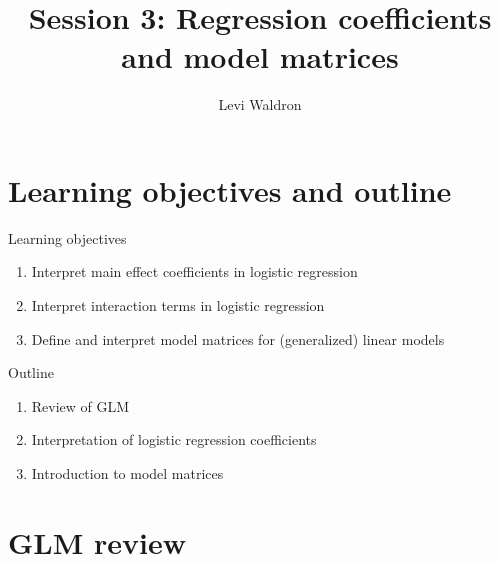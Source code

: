\documentclass[
  ignorenonframetext,
]{beamer}
\title{Session 3: Regression coefficients and model matrices}
\author{Levi Waldron}
\date{}
\institute{CUNY SPH Biostatistics 2}
\providecommand{\tightlist}{%
  \setlength{\itemsep}{0pt}\setlength{\parskip}{0pt}}
\begin{document}
\frame{\titlepage}

\hypertarget{learning-objectives-and-outline}{%
\section{Learning objectives and
outline}\label{learning-objectives-and-outline}}

\begin{frame}{Learning objectives}
\protect\hypertarget{learning-objectives}{}

\begin{enumerate}
\tightlist
\item
  Interpret main effect coefficients in logistic regression
\item
  Interpret interaction terms in logistic regression
\item
  Define and interpret model matrices for (generalized) linear models
\end{enumerate}

\end{frame}

\begin{frame}{Outline}
\protect\hypertarget{outline}{}

\begin{enumerate}
\tightlist
\item
  Review of GLM
\item
  Interpretation of logistic regression coefficients
\item
  Introduction to model matrices
\end{enumerate}

\end{frame}

\hypertarget{glm-review}{%
\section{GLM review}\label{glm-review}}
\end{document}

